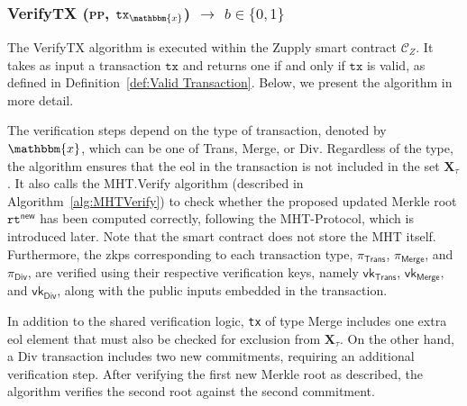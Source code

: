 




\subsubsection{\textsf{VerifyTX} (\textsc{pp}, $\texttt{tx}_\mathbbm{x}$) $\rightarrow$ $b \in \{0, 1\}$}

The \textsf{VerifyTX} algorithm is executed within the Zupply smart contract $\mathcal{C}_Z$.
It takes as input a transaction $\texttt{tx}$ and returns one if and only if $\texttt{tx}$ is valid, as defined in Definition~\ref{def:Valid Transaction}. Below, we present the algorithm in more detail.

The verification steps depend on the type of transaction, denoted by $\mathbbm{x}$, which can be one of \textsf{Trans}, \textsf{Merge}, or \textsf{Div}. Regardless of the type, the algorithm ensures that the \gls{eol} in the transaction is not included in the set $\mathbf{X}_\tau$. It also calls the \textsf{MHT}.\textsf{Verify} algorithm (described in Algorithm~\ref{alg:ٰMHTVerify}) to check whether the proposed updated Merkle root $\texttt{rt}^\textsf{new}$ has been computed correctly, following the \textsf{MHT-Protocol}, which is introduced later.  Note that the smart contract does not store the \textsf{MHT} itself.
Furthermore, the \glspl{zkp} corresponding to each transaction type, $\pi_\mathsf{Trans}$, $\pi_\mathsf{Merge}$, and $\pi_\mathsf{Div}$, are verified using their respective verification keys, namely $\mathsf{vk}_\mathsf{Trans}$, $\mathsf{vk}_\mathsf{Merge}$, and $\mathsf{vk}_\mathsf{Div}$, along with the public inputs embedded in the transaction.

In addition to the shared verification logic, \texttt{tx} of type \textsf{Merge} includes one extra \gls{eol} element that must also be checked for exclusion from $\mathbf{X}_\tau$. On the other hand, a \textsf{Div} transaction includes two new commitments, requiring an additional verification step. After verifying the first new Merkle root as described, the algorithm verifies the second root against the second commitment.


